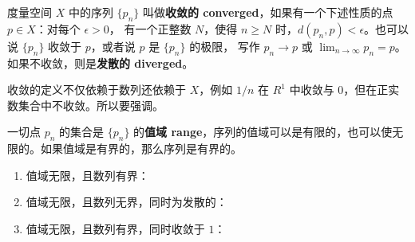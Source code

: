 \documentclass[../poma-notes.tex]{subfiles}
\begin{document}
\begin{anote}
  度量空间 $X$ 中的序列 $\{p_n\}$ 叫做\textbf{收敛的 converged}，如果有一个下述性质的点 $p \in X$：对每个 $\epsilon>0$，
  有一个正整数 $N$，使得 $n \ge N$ 时，$d(p_n,p)<\epsilon$。也可以说 $\{p_n\}$ 收敛于 $p$，或者说 $p$ 是 $\{p_n\}$ 的极限，
  写作 $p_n \to p$ 或 $\lim_{n \to \infty} p_n = p$。如果不收敛，则是\textbf{发散的 diverged}。

  收敛的定义不仅依赖于数列还依赖于 $X$，例如 ${1/n}$ 在 $R^1$ 中收敛与 $0$，但在正实数集合中不收敛。所以要强调。

  一切点 $p_n$ 的集合是 $\{p_n\}$ 的\textbf{值域 range}，序列的值域可以是有限的，也可以使无限的。如果值域是有界的，那么序列是有界的。

  \begin{enumerate}[label=(\alph*)]
    \item 值域无限，且数列有界：
          \begin{center}
          \end{center}
    \item 值域无限，且数列无界，同时为发散的：
          \begin{center}
          \end{center}
    \item 值域无限，且数列有界，同时收敛于 $1$：

\end{enumerate}
\end{anote}
\end{document}
